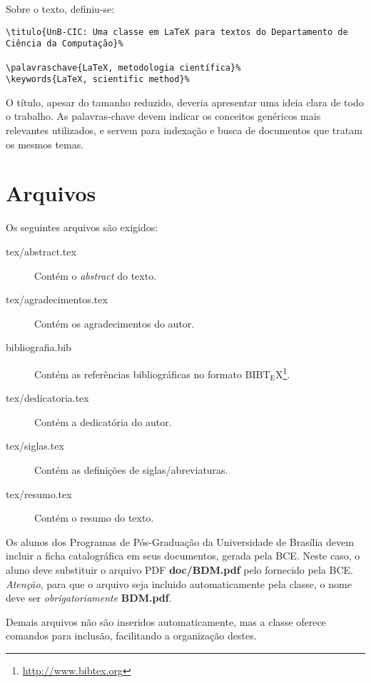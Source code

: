 Sobre o texto, definiu-se:
\begin{verbatim}
\titulo{UnB-CIC: Uma classe em LaTeX para textos do Departamento de
Ciência da Computação}%

\palavraschave{LaTeX, metodologia científica}%
\keywords{LaTeX, scientific method}%
\end{verbatim}

O título, apesar do tamanho reduzido, deveria apresentar uma ideia clara de todo
o trabalho. As palavras-chave devem indicar os conceitos genéricos mais relevantes
utilizados, e servem para indexação e busca de documentos que tratam os mesmos
temas.


\section{Arquivos}
Os seguintes arquivos são exigidos:
\begin{description}%
    \item[tex/abstract.tex] Contém o \emph{abstract} do texto.%
    \item[tex/agradecimentos.tex] Contém os agradecimentos do autor.%
    \item[bibliografia.bib] Contém as referências bibliográficas no formato
    ${\mathrm{B{\scriptstyle{IB}}T_{\displaystyle E}X}}$\footnote{\url{http://www.bibtex.org}}.%
    \item[tex/dedicatoria.tex] Contém a dedicatória do autor.%
    \item[tex/siglas.tex] Contém as definições de siglas/abreviaturas.%
    \item[tex/resumo.tex] Contém o resumo do texto.%
\end{description}%

Os alunos dos Programas de Pós-Graduação da Universidade de Brasília devem incluir a ficha catalográfica em seus documentos, gerada pela \acrfull{BCE}. Neste caso, o aluno deve substituir o arquivo PDF \textbf{doc/BDM.pdf} pelo fornecido pela \acrshort{BCE}. \emph{Atenção}, para que o arquivo seja incluido automaticamente pela classe, o nome deve ser \emph{obrigatoriamente} \textbf{BDM.pdf}.%

Demais arquivos não são inseridos automaticamente, mas a classe oferece comandos
para inclusão, facilitando a organização destes.

